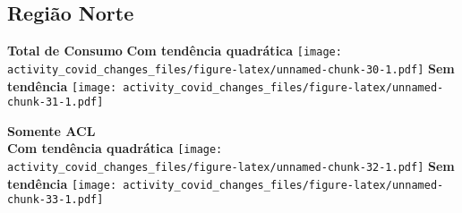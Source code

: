 \documentclass[
]{article}
\begin{document}
\pagebreak

\hypertarget{regiuxe3o-norte-1}{%
\subsection{Região Norte}\label{regiuxe3o-norte-1}}

\textbf{Total de Consumo} \textbf{Com tendência quadrática}
\texttt{[image: activity\_covid\_changes\_files/figure-latex/unnamed-chunk-30-1.pdf]}
\textbf{Sem tendência}
\texttt{[image: activity\_covid\_changes\_files/figure-latex/unnamed-chunk-31-1.pdf]}

\pagebreak

\textbf{Somente ACL}\\
\textbf{Com tendência quadrática}
\texttt{[image: activity\_covid\_changes\_files/figure-latex/unnamed-chunk-32-1.pdf]}
\textbf{Sem tendência}
\texttt{[image: activity\_covid\_changes\_files/figure-latex/unnamed-chunk-33-1.pdf]}
\end{document}
